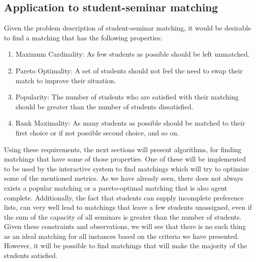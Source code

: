 \subsection{Application to student-seminar matching}
Given the problem description of student-seminar matching, it would be desirable to find a matching that has the following properties:
\begin{enumerate}
    \item Maximum Cardinality: As few students as possible should be left unmatched.
    \item Pareto Optimality: A set of students should not feel the need to swap their match to improve their situation.
    \item Popularity: The number of students who are satisfied with their matching should be greater than the number of students dissatisfied.
    \item Rank Maximality: As many students as possible should be matched to their first choice or if not possible second choice, and so on.
\end{enumerate}
Using these requirements, the next sections will present algorithms, for finding matchings that have some of those properties. One of these will be implemented to be used by the interactive system to find matchings which will try to optimize some of the mentioned metrics. As we have already seen, there does not always exists a popular matching or a pareto-optimal matching that is also agent complete. Additionally, the fact that students can supply incomplete preference lists, can very well lead to matchings that leave a few students unassigned, even if the sum of the capacity of all seminars is greater than the number of students. Given these constraints and observations, we will see that there is no such thing as an ideal matching for all instances based on the criteria we have presented. However, it will be possible to find matchings that will make the majority of the students satisfied.
